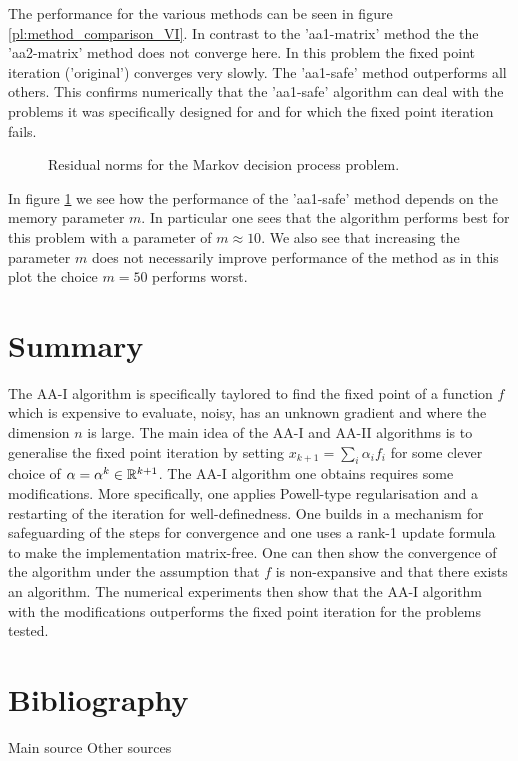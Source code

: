 The performance for the various methods can be seen in figure \ref{pl:method_comparison_VI}. In contrast to the 'aa1-matrix' method the the 'aa2-matrix' method does not converge here. In this problem the fixed point iteration ('original') converges very slowly. The 'aa1-safe' method outperforms all others. This confirms numerically that the 'aa1-safe' algorithm can deal with the problems it was specifically designed for and for which the fixed point iteration fails. 

\begin{figure}
	\centering
	{\scriptsize
	
	}
	\caption{Residual norms for the Markov decision process problem.}
	\label{pl:memory_comparison_VI}
\end{figure}

In figure \ref{pl:memory_comparison_VI}  we see how the performance of the 'aa1-safe' method depends on the memory parameter $m$. In particular one sees that the algorithm performs best for this problem with a parameter of $m\approx10$. We also see that increasing the parameter $m$ does not necessarily improve performance of the method as in this plot the choice $m=50$ performs worst.


\section{Summary}

The AA-I algorithm is specifically taylored to find the fixed point of a function $f$ which is expensive to evaluate, noisy, has an unknown gradient and where the dimension $n$ is large. The main idea of the AA-I and AA-II algorithms is to generalise the fixed point iteration by setting $x_{k+1}=\sum_i\alpha_if_i$ for some clever choice of $\alpha=\alpha^k\in\mathbb{R}^{k+1}$. The AA-I algorithm one obtains requires some modifications. More specifically, one applies Powell-type regularisation and a restarting of the iteration for well-definedness. One builds in a mechanism for safeguarding of the steps for convergence and one uses a rank-1 update formula to make the implementation matrix-free. One can then show the convergence of the algorithm under the assumption that $f$ is non-expansive and that there exists an algorithm. The numerical experiments then show that the AA-I algorithm with the modifications outperforms the fixed point iteration for the problems tested.



\newpage
\section*{Bibliography}
\nocite{*}
Main source
\printbibliography[heading=none, keyword={main}]
\noindent Other sources
\printbibliography[heading=none, keyword={secondary}]


